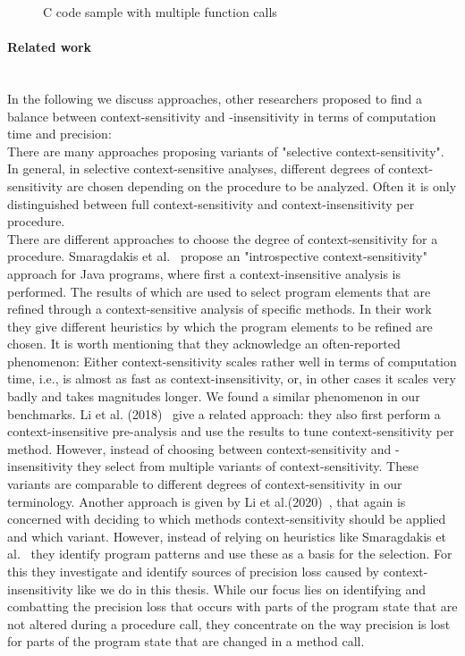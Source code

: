   \begin{figure}
    \centering
    \begin{subfigure}{0.35\textwidth}
      \centering
      
    \end{subfigure}
    \caption{C code sample with multiple function calls}
    \label{fig:exampleIntro}
  \end{figure}


\paragraph{Related work}\mbox{}\\
In the following we discuss approaches, other researchers proposed to find a balance between context-sensitivity and -insensitivity in terms of computation time and precision:\\
There are many approaches proposing variants of "selective context-sensitivity". In general, in selective context-sensitive analyses, different degrees of context-sensitivity are chosen depending on the procedure to be analyzed. Often it is only distinguished between full context-sensitivity and context-insensitivity per procedure.\\
There are different approaches to choose the degree of context-sensitivity for a procedure. Smaragdakis et al.~\parencite{TODO} propose an "introspective context-sensitivity" approach for Java programs, where first a context-insensitive analysis is performed. The results of which are used to select program elements that are refined through a context-sensitive analysis of specific methods. In their work they give different heuristics by which the program elements to be refined are chosen. It is worth mentioning that they acknowledge an often-reported phenomenon: Either context-sensitivity scales rather well in terms of computation time, i.e., is almost as fast as context-insensitivity, or, in other cases it scales very badly and takes magnitudes longer. We found a similar phenomenon in our benchmarks. Li et al. (2018)~\parencite{TODO} give a related approach: they also first perform a context-insensitive pre-analysis and use the results to tune context-sensitivity per method. However, instead of choosing between context-sensitivity and -insensitivity they select from multiple variants of context-sensitivity. These variants are comparable to different degrees of context-sensitivity in our terminology. Another approach is given by Li et al.(2020)~\parencite{TODO}, that again is concerned with deciding to which methods context-sensitivity should be applied and which variant. However, instead of relying on heuristics like Smaragdakis et al.~\parencite{TODO} they identify program patterns and use these as a basis for the selection. For this they investigate and identify sources of precision loss caused by context-insensitivity like we do in this thesis. While our focus lies on identifying and combatting the precision loss that occurs with parts of the program state that are not altered during a procedure call, they concentrate on the way precision is lost for parts of the program state that are changed in a method call.\\


